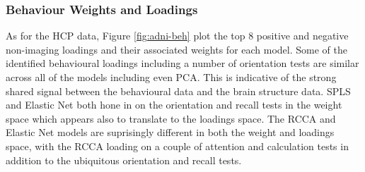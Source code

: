 \subsubsection{Behaviour Weights and Loadings}

As for the HCP data, Figure \ref{fig:adni-beh} plot the top 8 positive and negative non-imaging loadings and their associated weights for each model.
Some of the identified behavioural loadings including a number of orientation tests are similar across all of the models including even PCA.
This is indicative of the strong shared signal between the behavioural data and the brain structure data.
SPLS and Elastic Net both hone in on the orientation and recall tests in the weight space which appears also to translate to the loadings space.
The RCCA and Elastic Net models are suprisingly different in both the weight and loadings space, with the RCCA loading on a couple of attention and calculation tests in addition to the ubiquitous orientation and recall tests.


